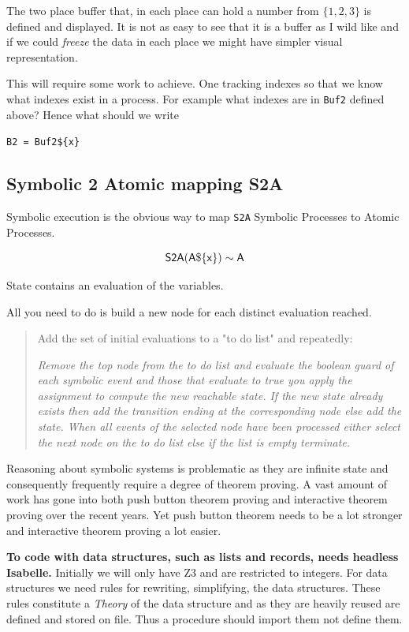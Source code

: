 \documentclass[]{article}
\begin{document}
{The two place buffer that, in each place can hold a number from $\{1,2,3\}$ is defined and displayed.  It is not as easy to see that it is a buffer as I wild like and if we could \emph{freeze} the data in each place we might have simpler visual representation. 


This will require some work to achieve.  One tracking  indexes so that we know what indexes exist in a process. For example what indexes are in \verb|Buf2| defined above? Hence what should we write

\verb|B2 = Buf2${x}|
}



\subsection{Symbolic 2 Atomic mapping S2A}
Symbolic execution  is the obvious way  to  map \verb|S2A|  Symbolic Processes  to  Atomic Processes.  

\[{\sf S2A(A\$\{x\})\sim  A }\]  

State contains  an evaluation of the variables. 


All you need to do is build a new node for each distinct evaluation reached. 

 \begin{quote}
 Add  the set of initial evaluations to a "to do list" and repeatedly:
 
 \emph{Remove the top node from the to do list and evaluate the boolean guard of each  symbolic event and those that evaluate to true you apply the assignment to compute the new reachable state. If the new state already exists then add the transition ending at the corresponding  node else add the state.  When  all events of the selected node have been processed either select the next node on the to do list else if the list is empty terminate.  } 
 \end{quote}




Reasoning about symbolic systems is problematic as they are infinite state and consequently frequently require a degree of theorem proving. A vast amount of work has gone into both push button theorem proving and interactive theorem proving over the recent years.  Yet push button theorem needs to be a lot stronger and interactive theorem proving a lot easier.

{\bf To code with data structures, such as lists and records,  needs headless Isabelle.}  Initially we will only have Z3 and are restricted to integers.  For data structures  we need rules for rewriting, simplifying, the data structures. These rules constitute a \emph{Theory} of the data structure and as they are heavily reused are defined and stored on file. Thus a procedure should import them  not define them.
\end{document}
